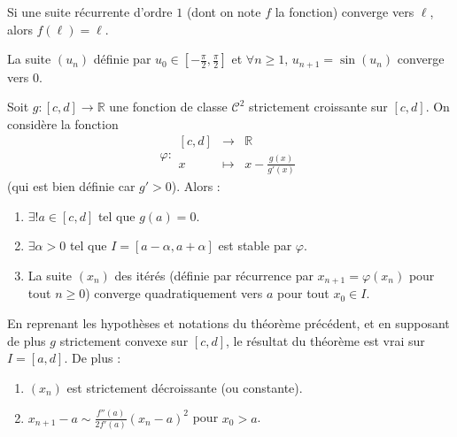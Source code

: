   \begin{corollary}
    Si une suite récurrente d'ordre $1$ (dont on note $f$ la fonction) converge vers $\ell$, alors $f(\ell) = \ell$.
  \end{corollary}

  \begin{example}
    La suite $(u_n)$ définie par $u_0 \in \left[ -\frac{\pi}{2}, \frac{\pi}{2} \right]$ et $\forall n \geq 1, \, u_{n+1} = \sin(u_n)$ converge vers $0$.
  \end{example}


  \begin{application}
    Soit $g : [c, d] \rightarrow \mathbb{R}$ une fonction de classe $\mathcal{C}^2$ strictement croissante sur $[c, d]$. On considère la fonction
    \[ \varphi :
    \begin{array}{ccc}
      [c, d] &\rightarrow& \mathbb{R} \\
      x &\mapsto& x - \frac{g(x)}{g'(x)}
    \end{array}
    \]
    (qui est bien définie car $g' > 0$). Alors :
    \begin{enumerate}[label=(\roman*)]
      \item $\exists! a \in [c, d]$ tel que $g(a) = 0$.
      \item $\exists \alpha > 0$ tel que $I = [a - \alpha, a + \alpha]$ est stable par $\varphi$.
      \item La suite $(x_n)$ des itérés (définie par récurrence par $x_{n+1} = \varphi(x_n)$ pour tout $n \geq 0$) converge quadratiquement vers $a$ pour tout $x_0 \in I$.
    \end{enumerate}
  \end{application}

  \begin{corollary}
    En reprenant les hypothèses et notations du théorème précédent, et en supposant de plus $g$ strictement convexe sur $[c, d]$, le résultat du théorème est vrai sur $I = [a, d]$. De plus :
    \begin{enumerate}[label=(\roman*)]
      \item $(x_n)$ est strictement décroissante (ou constante).
      \item $x_{n+1} - a \sim \frac{f''(a)}{2f'(a)} (x_n - a)^2$ pour $x_0 > a$.
    \end{enumerate}
  \end{corollary}

